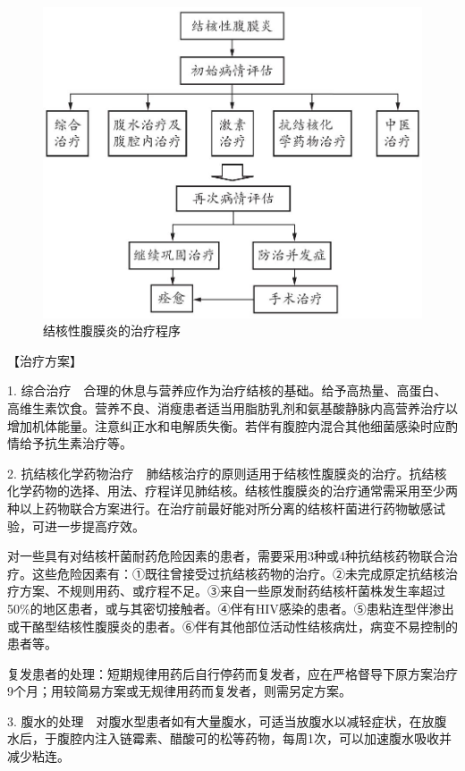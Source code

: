 \begin{figure}[!htbp]
 \centering
 \includegraphics{./images/Image00091.jpg}
 \captionsetup{justification=centering}
 \caption{结核性腹膜炎的治疗程序}
 \label{fig3-5-2}
  \end{figure} 

【治疗方案】

1.
综合治疗　合理的休息与营养应作为治疗结核的基础。给予高热量、高蛋白、高维生素饮食。营养不良、消瘦患者适当用脂肪乳剂和氨基酸静脉内高营养治疗以增加机体能量。注意纠正水和电解质失衡。若伴有腹腔内混合其他细菌感染时应酌情给予抗生素治疗等。

2.
抗结核化学药物治疗　肺结核治疗的原则适用于结核性腹膜炎的治疗。抗结核化学药物的选择、用法、疗程详见肺结核。结核性腹膜炎的治疗通常需采用至少两种以上药物联合方案进行。在治疗前最好能对所分离的结核杆菌进行药物敏感试验，可进一步提高疗效。

对一些具有对结核杆菌耐药危险因素的患者，需要采用3种或4种抗结核药物联合治疗。这些危险因素有：①既往曾接受过抗结核药物的治疗。②未完成原定抗结核治疗方案、不规则用药、或疗程不足。③来自一些原发耐药结核杆菌株发生率超过50\%的地区患者，或与其密切接触者。④伴有HIV感染的患者。⑤患粘连型伴渗出或干酪型结核性腹膜炎的患者。⑥伴有其他部位活动性结核病灶，病变不易控制的患者等。

复发患者的处理：短期规律用药后自行停药而复发者，应在严格督导下原方案治疗9个月；用较简易方案或无规律用药而复发者，则需另定方案。

3.
腹水的处理　对腹水型患者如有大量腹水，可适当放腹水以减轻症状，在放腹水后，于腹腔内注入链霉素、醋酸可的松等药物，每周1次，可以加速腹水吸收并减少粘连。

